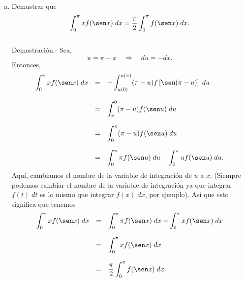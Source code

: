 \begin{enumerate}[\bfseries 1.]
\begin{enumerate}[(a)]
		\item Demustrar que
		$$\int_0^\pi xf(\sen x)\; dx = \dfrac{\pi}{2}\int_0^\pi f(\sen x)\; dx.$$\\
		    Demostración.-\; Sea,
		    $$u=\pi-x \quad \Rightarrow \quad du=-dx.$$
		    Entonces,
		    $$\begin{array}{rcl}
			\displaystyle\int_0^\pi xf(\sen x)\; dx &=& \displaystyle - \int_{u(0)}^{u(\pi)}(\pi-u)f\left[\sen(\pi-u)\right]\; du\\\\
								&=&\displaystyle \int_\pi^0 (\pi-u)f(\sen u)\; du\\\\
								&=&\displaystyle \int_0^\pi (\pi-u)f(\sen u)\; du\\\\
								&=&\displaystyle \int_0^\pi \pi f(\sen u)\; du - \int_0^\pi uf(\sen u)\; du.
		    \end{array}$$
		    Aquí, cambiamos el nombre de la variable de integración de $u$ a $x$. (Siempre podemos cambiar el nombre de la variable de integración ya que integrar $f(t)\; dt$ es lo mismo que integrar $f(x)\; dx$, por ejemplo). Así que esto significa que tenemos
		    $$\begin{array}{rcl}
			\displaystyle\int_0^\pi xf(\sen x)\; dx &=& \displaystyle \int_0^\pi \pi f(\sen x)\; dx - \int_0^\pi xf(\sen x)\; dx\\\\
								&=&\displaystyle \int_0^\pi xf(\sen x)\; dx\\\\
								&=&\dfrac{\pi}{2} \displaystyle\int_0^\pi f(\sen x)\; dx.
		    \end{array}$$
		    \vspace{.5cm}


\end{enumerate}
\end{enumerate}
